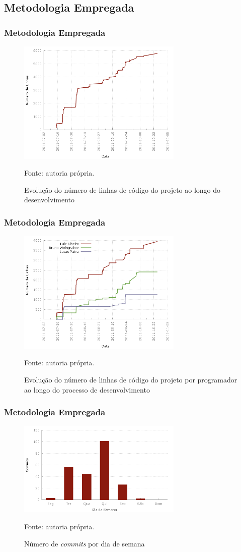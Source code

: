 \subsection{Metodologia Empregada}
\frame
{
\frametitle{Metodologia Empregada}
\begin{figure}
\includegraphics[width=0.7\textwidth]{./imgs/lines_of_code.png}
\caption{Evolução do número de linhas de código do projeto ao longo do desenvolvimento}
\tiny
Fonte: autoria própria.
\end{figure}
}

\frame
{
\frametitle{Metodologia Empregada}
\begin{figure}
\includegraphics[width=0.7\textwidth]{./imgs/lines_of_code_by_author.png}
\caption{Evolução do número de linhas de código do projeto por programador ao longo do processo de desenvolvimento}
\tiny
Fonte: autoria própria.
\end{figure}
}

\frame
{
\frametitle{Metodologia Empregada}
\begin{figure}
\includegraphics[width=0.7\textwidth]{./imgs/day_of_week.png}
\caption{Número de \emph{commits} por dia de semana}
\tiny
Fonte: autoria própria.
\end{figure}


}

